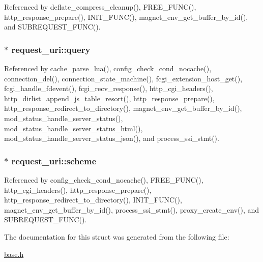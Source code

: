 Referenced by deflate\-\_\-compress\-\_\-cleanup(), F\-R\-E\-E\-\_\-\-F\-U\-N\-C(), http\-\_\-response\-\_\-prepare(), I\-N\-I\-T\-\_\-\-F\-U\-N\-C(), magnet\-\_\-env\-\_\-get\-\_\-buffer\-\_\-by\-\_\-id(), and S\-U\-B\-R\-E\-Q\-U\-E\-S\-T\-\_\-\-F\-U\-N\-C().

\hypertarget{structrequest__uri_ad45f79467c7ec2112cf16fee49db534a}{
\subsubsection[{query}]{$\ast$ request\-\_\-uri\-::query}}\label{structrequest__uri_ad45f79467c7ec2112cf16fee49db534a}


Referenced by cache\-\_\-parse\-\_\-lua(), config\-\_\-check\-\_\-cond\-\_\-nocache(), connection\-\_\-del(), connection\-\_\-state\-\_\-machine(), fcgi\-\_\-extension\-\_\-host\-\_\-get(), fcgi\-\_\-handle\-\_\-fdevent(), fcgi\-\_\-recv\-\_\-response(), http\-\_\-cgi\-\_\-headers(), http\-\_\-dirlist\-\_\-append\-\_\-js\-\_\-table\-\_\-resort(), http\-\_\-response\-\_\-prepare(), http\-\_\-response\-\_\-redirect\-\_\-to\-\_\-directory(), magnet\-\_\-env\-\_\-get\-\_\-buffer\-\_\-by\-\_\-id(), mod\-\_\-status\-\_\-handle\-\_\-server\-\_\-status(), mod\-\_\-status\-\_\-handle\-\_\-server\-\_\-status\-\_\-html(), mod\-\_\-status\-\_\-handle\-\_\-server\-\_\-status\-\_\-json(), and process\-\_\-ssi\-\_\-stmt().

\hypertarget{structrequest__uri_ae38b75ebd9c40c255309b30b9b5f22f2}{
\subsubsection[{scheme}]{$\ast$ request\-\_\-uri\-::scheme}}\label{structrequest__uri_ae38b75ebd9c40c255309b30b9b5f22f2}


Referenced by config\-\_\-check\-\_\-cond\-\_\-nocache(), F\-R\-E\-E\-\_\-\-F\-U\-N\-C(), http\-\_\-cgi\-\_\-headers(), http\-\_\-response\-\_\-prepare(), http\-\_\-response\-\_\-redirect\-\_\-to\-\_\-directory(), I\-N\-I\-T\-\_\-\-F\-U\-N\-C(), magnet\-\_\-env\-\_\-get\-\_\-buffer\-\_\-by\-\_\-id(), process\-\_\-ssi\-\_\-stmt(), proxy\-\_\-create\-\_\-env(), and S\-U\-B\-R\-E\-Q\-U\-E\-S\-T\-\_\-\-F\-U\-N\-C().



The documentation for this struct was generated from the following file\-:\begin{DoxyCompactItemize}
\item 
\hyperlink{base_8h}{base.\-h}\end{DoxyCompactItemize}
